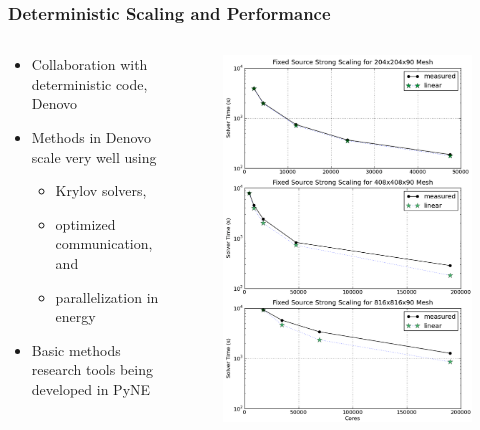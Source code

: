 \documentclass[xcolor=x11names,compress]{beamer}
\renewcommand{\(}{\begin{columns}}
\renewcommand{\)}{\end{columns}}
\newcommand{\<}[1]{\begin{column}{#1}}
\renewcommand{\>}{\end{column}}
\begin{document}
\begin{frame}[fragile]
  \frametitle{Deterministic Scaling and Performance}

	\begin{columns}
  	\begin{column}{0.5\textwidth}
     \begin{itemize}
     \item Collaboration with deterministic code, \alert{Denovo} \cite{Evans2010} 
     \item Methods in Denovo scale very well using
       \begin{itemize}
       \item Krylov solvers, 
       \item optimized communication, and 
       \item parallelization in energy
       \end{itemize}
       \vspace*{1 em}
     \item Basic methods research tools being developed in \alert{PyNE} \cite{pyne2014}
     \end{itemize}
  	\end{column}
 	\begin{column}{0.5\textwidth}
 	 \begin{center}
 	 \begin{figure}
 	 \includegraphics[height=3 in,clip]{../figs/FxdSrcKrylovStrongScaling}  
 	 \end{figure}
 	 \end{center}
  	\end{column}
	\end{columns}

\end{frame}
\end{document}
